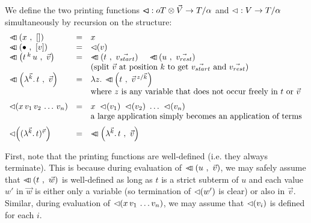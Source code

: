 \documentclass[submission,copyright,creativecommons]{eptcs}
\begin{document}
\begin{defin}
We define the two printing functions $\lhd \hspace{-8pt} \lhd : oT \otimes \vec {V} \rightarrow T / \alpha$ and $\mathord{\lhd} : V \rightarrow T / \alpha$ simultaneously by recursion on the structure:
\[
\begin{array}{lcl}
\pr{x}{\emptyVec} & = & x \\
\pr{\ovar}{[v]} & = & \prVal v \\
\pr{t \oapp k u}{\vec v} & = & \ApA {\pr {t}{\vec{v_{start}}}  }  {\quad \pr {u}{\vec{v_{rest}}}} \\
&& \mbox{(split $\vec v$ at position $k$ to get $\vec{v_{start}}$ and $\vec{v_{rest}}$)} \\
\pr{\LaO {\vec k} t}{\vec v} & = & \LaA z {\pr {t} {  \multiinsert{\vec v}{\vec k}{z}   }}   \\
\medskip
&& \mbox{where $z$ is any variable that does not occur freely in $t$ or $\vec v$ } \\
\prVal{x \sspace v_1 \sspace v_2 \sspace \ldots \sspace v_n} & = & x \ \prVal{v_1} \ \prVal{v_2} \ \ldots \ \prVal{v_n} \\
\medskip && \mbox{a large application simply becomes an application of terms} \\
\prVal{\Val {\vec k} t {\vec v}} & = & \pr{\LaO {\vec k} t}{\vec v} \\
\end{array}
\]
\end{defin}
First, note that the printing functions are well-defined (i.e. they always terminate). This is because during evaluation of $\lhd \hspace{-8pt} \lhd \left( u \ , \ \vec v \right)$, we may safely assume that $\lhd \hspace{-8pt} \lhd \left( t \ , \ \vec w \right)$ is well-defined as long as $t$ is a strict subterm of $u$ and each value $w'$ in $\vec w$ is either only a variable (so termination of $\lhd \hspace{-2pt} \left( w' \right)$ is clear) or also in $\vec v$. Similar, during evaluation of $\lhd \hspace{-2pt} \left( x \, v_1 \, \ldots v_n \right)$, we may assume that $\lhd \hspace{-2pt} \left( v_i \right)$ is defined for each $i$.
\end{document}

